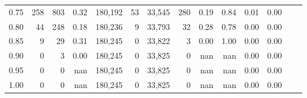 \begin{tabular}{rrrrrrrrrrrrrr}
0.75 &     258 &    803 &    0.32 &  180,192 &       53 &  33,545 &     280 &  0.19 &  0.84 &  0.01 &      0.00 \\
0.80 &      44 &    248 &    0.18 &  180,236 &        9 &  33,793 &      32 &  0.28 &  0.78 &  0.00 &      0.00 \\
0.85 &       9 &     29 &    0.31 &  180,245 &        0 &  33,822 &       3 &  0.00 &  1.00 &  0.00 &      0.00 \\
0.90 &       0 &      3 &    0.00 &  180,245 &        0 &  33,825 &       0 &   nan &   nan &  0.00 &      0.00 \\
0.95 &       0 &      0 &     nan &  180,245 &        0 &  33,825 &       0 &   nan &   nan &  0.00 &      0.00 \\
1.00 &       0 &      0 &     nan &  180,245 &        0 &  33,825 &       0 &   nan &   nan &  0.00 &      0.00 \\
\bottomrule
\end{tabular}
